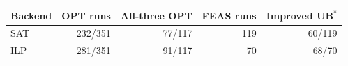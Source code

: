 \begin{tabular}{lrrrr}
\toprule
Backend & OPT runs & All-three OPT & FEAS runs & Improved UB$^*$ \\
\midrule
SAT & 232/351 & 77/117 & 119 & 60/119 \\
ILP & 281/351 & 91/117 & 70 & 68/70 \\
\bottomrule
\end{tabular}
